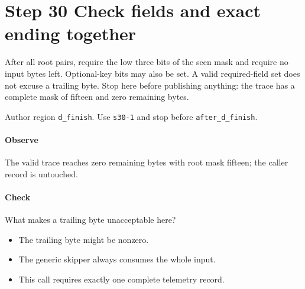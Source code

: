 \section{Step 30 Check fields and exact ending together}\label{cbor-s30}
After all root pairs, require the low three bits of the seen mask and require no input bytes left. Optional-key bits may also be set. A valid required-field set does not excuse a trailing byte. Stop here before publishing anything: the trace has a complete mask of fifteen and zero remaining bytes.

Author region \texttt{d\_finish}. Use \texttt{s30-1} and stop before \texttt{after\_d\_finish}.

\paragraph{Observe} The valid trace reaches zero remaining bytes with root mask fifteen; the caller record is untouched.

\paragraph{Check} What makes a trailing byte unacceptable here?
\begin{itemize}
\item[A.] The trailing byte might be nonzero.
\item[B.] The generic skipper always consumes the whole input.
\item[C.] This call requires exactly one complete telemetry record.
\end{itemize}
